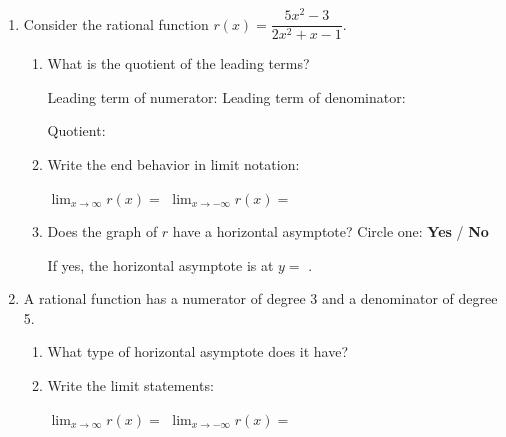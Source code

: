 \documentclass[10pt]{article}
\begin{document}
\namedateperiod

\vspace{0.16in}

\begin{enumerate}[itemsep=18pt]

\item Consider the rational function $r(x) = \dfrac{5x^2 - 3}{2x^2 + x - 1}$.

\begin{enumerate}[label=(\alph*), itemsep=10pt]
  \item What is the quotient of the leading terms?

        \medskip
        Leading term of numerator: \blank{2.5cm} \quad
        Leading term of denominator: \blank{2.5cm}

        \medskip
        Quotient: \blank{3.5cm}

  \item Write the end behavior in limit notation:

        \medskip
        $\displaystyle\lim_{x \to \infty} r(x) = $ \blank{2.5cm}
        \qquad
        $\displaystyle\lim_{x \to -\infty} r(x) = $ \blank{2.5cm}

  \item Does the graph of $r$ have a horizontal asymptote?
        Circle one: \quad \textbf{Yes} \quad / \quad \textbf{No}

        \medskip
        If yes, the horizontal asymptote is at $y = $ \blank{2cm}.
\end{enumerate}

\item A rational function has a numerator of degree 3 and a denominator of degree 5.

\begin{enumerate}[label=(\alph*), itemsep=8pt]
  \item What type of horizontal asymptote does it have? \blank{5cm}
  \item Write the limit statements:

        \medskip
        $\displaystyle\lim_{x \to \infty} r(x) = $ \blank{2.5cm}
        \qquad
        $\displaystyle\lim_{x \to -\infty} r(x) = $ \blank{2.5cm}
\end{enumerate}

\end{enumerate}
\end{document}
